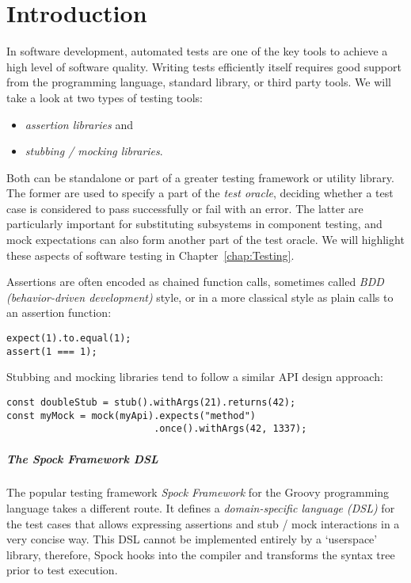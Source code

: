 \chapter{Introduction}
In software development, automated tests are one of the key tools
to achieve a high level of software quality.
Writing tests efficiently itself requires good support
from the programming language, standard library, or third party tools.
We will take a look at two types of testing tools:
\begin{itemize}
  \item \textit{assertion libraries} and
  \item \textit{stubbing / mocking libraries}.
\end{itemize}
Both can be standalone or part of a greater testing framework or utility library.
The former are used to specify a part of the \textit{test oracle},
deciding whether a test case is considered to pass successfully or fail with an error.
The latter are particularly important for substituting subsystems in component testing,
and mock expectations can also form another part of the test oracle.
We will highlight these aspects of software testing in Chapter~\ref{chap:Testing}.

Assertions are often encoded as chained function calls,
sometimes called \textit{BDD (behavior-driven development)} style,
or in a more classical style as plain calls to an assertion function:
\autocite{ChaiBddDoc}\autocite{ChaiTddDoc}
\begin{verbatim}
expect(1).to.equal(1);
assert(1 === 1);
\end{verbatim}
Stubbing and mocking libraries tend to follow a similar API design approach:
\autocite{SinonStubDoc}\autocite{SinonMockDoc}
\begin{verbatim}
const doubleStub = stub().withArgs(21).returns(42);
const myMock = mock(myApi).expects("method")
                          .once().withArgs(42, 1337);
\end{verbatim}

\paragraph{The Spock Framework DSL}
The popular testing framework \textit{Spock Framework}
for the Groovy programming language takes a different route.
It defines a \textit{domain-specific language (DSL)} for the test cases
that allows expressing assertions and stub / mock interactions in a very concise way.
This DSL cannot be implemented entirely by a `userspace' library, therefore,
Spock hooks into the compiler and transforms the syntax tree prior to test execution.
